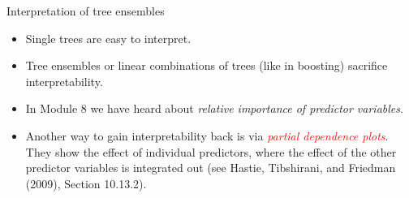 \documentclass[
  10pt,
  ignorenonframetext,
]{beamer}
\providecommand{\tightlist}{%
  \setlength{\itemsep}{0pt}\setlength{\parskip}{0pt}}
\begin{document}
\begin{frame}{Interpretation of tree ensembles}
\label{interpretation-of-tree-ensembles}
\(~\)

\begin{itemize}
\tightlist
\item
  Single trees are easy to interpret.
\end{itemize}

\vspace{2mm}

\begin{itemize}
\tightlist
\item
  Tree ensembles or linear combinations of trees (like in boosting)
  sacrifice interpretability.
\end{itemize}

\vspace{2mm}

\begin{itemize}
\tightlist
\item
  In Module 8 we have heard about \emph{relative importance of predictor
  variables}.
\end{itemize}

\vspace{2mm}

\begin{itemize}
\tightlist
\item
  Another way to gain interpretability back is via
  \emph{\textcolor{red}{partial dependence plots}}. They show the effect
  of individual predictors, where the effect of the other predictor
  variables is integrated out (see Hastie, Tibshirani, and Friedman
  (2009), Section 10.13.2).
\end{itemize}
\end{frame}
\end{document}
